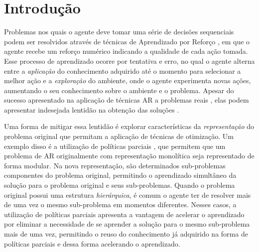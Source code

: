 \documentclass[kdmile,a4paper]{kdmile} %
\title{\titulo}
\author{R. L. Beirigo and V. Freire and A. H. R. Costa}
\institute{Escola Politécnica da Universidade de São Paulo, Brazil \\
  \email{\{rafaelbeirigo, valdinei.freire, anna.reali\}@usp.br}
}
\begin{document}
\begin{bottomstuff}
\end{bottomstuff}

\maketitle

\section{Introdução}
Problemas nos quais o agente deve tomar uma série de decisões
sequenciais podem ser resolvidos através de técnicas de Aprendizado
por Reforço \cite{rlczaba}, em que o agente recebe um reforço numérico
indicando a qualidade de cada ação tomada. Esse processo de
aprendizado ocorre por tentativa e erro, no qual o agente alterna
entre a \emph{aplicação} do conhecimento adquirido até o momento para
selecionar a melhor ação e a \emph{exploração} do ambiente, onde o
agente experimenta novas ações, aumentando o seu conhecimento sobre o
ambiente e o problema. Apesar do sucesso apresentado na aplicação de
técnicas AR a problemas reais
\cite{tesauro1995tdgammon,barto1996elevator,scardua2002optimal,da2006inverse,abbeel2007helicopter},
elas podem apresentar indesejada lentidão na obtenção das soluções
\cite{barto2003hrl}.
 
Uma forma de mitigar essa lentidão é explorar características da
\emph{representação} do problema original que permitam a aplicação
de técnicas de otimização. Um exemplo disso é a utilização de
políticas parciais \cite{option1999}, que permitem que um problema
de AR originalmente com representação monolítica seja representado
de forma modular. Na nova representação, são determinados
sub-problemas componentes do problema original, permitindo o
aprendizado simultâneo da solução para o problema original e seus
sub-problemas. Quando o problema original possui uma estrutura
\emph{hierárquica}, é comum o agente ter de resolver mais de uma vez
o mesmo sub-problema em momentos diferentes. Nesses casos, a
utilização de políticas parciais apresenta a vantagem de acelerar o
aprendizado por eliminar a necessidade de se aprender a solução para
o mesmo sub-problema mais de uma vez, permitindo o reuso do
conhecimento já adquirido na forma de políticas parciais
\cite{option1999} e dessa forma acelerando o aprendizado.
\end{document}
